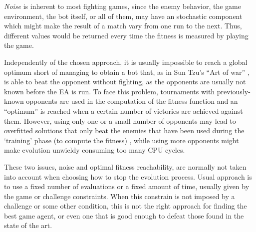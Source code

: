 \documentclass[runningheads,a4paper]{llncs}
\begin{document}
\textit{Noise} is inherent to most fighting games, since the enemy behavior, the game environment, the bot itself, or all of them, may have an
stochastic component which might make the result of a match vary from
one run to the next. Thus, different values would be returned
every time the fitness is measured by playing the game.

Independently of the chosen approach, it is usually impossible to reach a 
global optimum short of managing to obtain a bot that, as in Sun Tzu's ``Art of 
war'' \cite{tzu2013art}, is able to beat the opponent without fighting, as the 
opponents are usually not known before the EA is run.
To face this problem, tournaments with previously-known opponents are used in 
the computation of the fitness function and an ``optimum'' is reached when a 
certain number of victories are achieved against them. However, using only one 
or a small number of opponents may lead to overfitted solutions that only beat 
the enemies that have been used during the `training' phase (to compute the 
fitness) \cite{DBLP:journals/jcst/MoraFGGF12}, while using more opponents might 
make evolution unwieldy consuming too many CPU cycles.

These two issues, noise and optimal fitness reachability, are normally not 
taken into account when choosing how to stop the evolution process. Usual 
approach is to use a fixed number of evaluations or a fixed amount of time, 
usually given by the game or challenge constraints. When this constrain is not 
imposed by a challenge or some other condition, this is not the right approach 
for finding the best game agent, or even one that is good enough to defeat 
those found in the state of the art.
\end{document}
